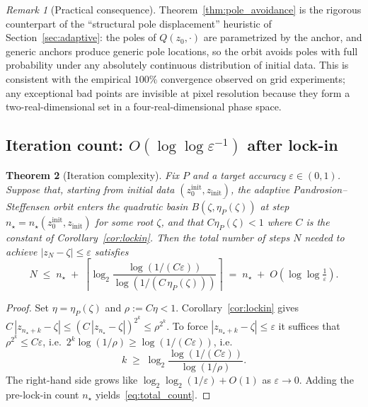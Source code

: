 \documentclass[10pt,a4paper,oneside]{book}
\newtheorem{theorem}{Theorem}[chapter]
\theoremstyle{definition}
\theoremstyle{remark}
\newtheorem{remark}[theorem]{Remark}
\begin{document}
\begin{remark}[Practical consequence]
Theorem~\ref{thm:pole_avoidance} is the rigorous counterpart of the ``structural pole displacement'' heuristic of Section~\ref{sec:adaptive}: the poles of $Q(z_0, \cdot)$ are parametrized by the anchor, and generic anchors produce generic pole locations, so the orbit avoids poles with full probability under any absolutely continuous distribution of initial data.  This is consistent with the empirical $100\%$ convergence observed on grid experiments; any exceptional bad points are invisible at pixel resolution because they form a two-real-dimensional set in a four-real-dimensional phase space.
\end{remark}

\subsection{Iteration count: \texorpdfstring{$O(\log\log \varepsilon^{-1})$}{O(log log 1/eps)} after lock-in}

\begin{theorem}[Iteration complexity]
\label{thm:iteration_count}
Fix $P$ and a target accuracy $\varepsilon \in (0, 1)$.  Suppose that, starting from initial data $(z_0^{\mathrm{init}}, z_{\mathrm{init}})$, the adaptive Pandrosion--Steffensen orbit enters the quadratic basin $\overline{B(\zeta, \eta_P(\zeta))}$ at step $n_\star = n_\star(z_0^{\mathrm{init}}, z_{\mathrm{init}})$ for some root $\zeta$, and that $C \eta_P(\zeta) < 1$ where $C$ is the constant of Corollary~\ref{cor:lockin}.  Then the total number of steps $N$ needed to achieve $|z_N - \zeta| \leq \varepsilon$ satisfies
\begin{equation}
  \label{eq:total_count}
  N \;\leq\; n_\star \;+\; \left\lceil \log_2 \frac{\log(1/(C\varepsilon))}{\log(1/(C\,\eta_P(\zeta)))} \right\rceil
  \;=\; n_\star \;+\; O\!\left(\log\log \tfrac{1}{\varepsilon}\right).
\end{equation}
\end{theorem}

\begin{proof}
Set $\eta = \eta_P(\zeta)$ and $\rho := C\eta < 1$.  Corollary~\ref{cor:lockin} gives $C\,|z_{n_\star + k} - \zeta| \leq (C\,|z_{n_\star} - \zeta|)^{2^k} \leq \rho^{2^k}$.  To force $|z_{n_\star + k} - \zeta| \leq \varepsilon$ it suffices that $\rho^{2^k} \leq C\varepsilon$, i.e.\ $2^k \log(1/\rho) \geq \log(1/(C\varepsilon))$, i.e.
\[
  k \;\geq\; \log_2\!\frac{\log(1/(C\varepsilon))}{\log(1/\rho)}.
\]
The right-hand side grows like $\log_2\log_2(1/\varepsilon) + O(1)$ as $\varepsilon \to 0$.  Adding the pre-lock-in count $n_\star$ yields~\eqref{eq:total_count}.
\end{proof}
\end{document}
